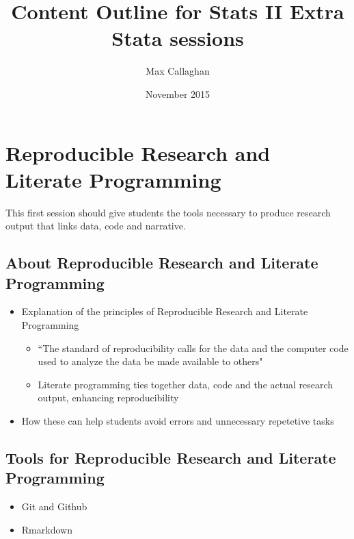 \documentclass{scrartcl}
\begin{document}
	\title{Content Outline for Stats II Extra Stata sessions}
	\author{Max Callaghan}
	\date{November 2015}
	
	\maketitle
	
\section{Reproducible Research and Literate Programming}
This first session should give students the tools necessary to produce research output that links data, code and narrative.
\subsection{About Reproducible Research and Literate Programming}
\begin{itemize}
  \item Explanation of the principles of Reproducible Research and Literate Programming
  \begin{itemize}
    \item ``The standard of reproducibility calls for the data and the computer code used to analyze the data be made available to others" \cite{peng}
    \item Literate programming ties together data, code and the actual research output, enhancing reproducibility
  \end{itemize}
  \item How these can help students avoid errors and unnecessary repetetive tasks
  
\end{itemize}

\subsection{Tools for Reproducible Research and Literate Programming}
\begin{itemize}
  \item Git and Github
  \item Rmarkdown
\end{itemize}
\end{document}
